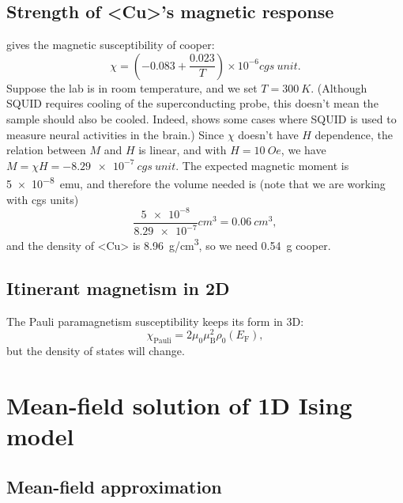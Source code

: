 \documentclass[hyperref, a4paper]{article}
\def\ce#1{<#1>}%
\newcommand*{\efermi}{E_{\text{F}}}
\newcommand*{\muB}{\mu_{\text{B}}}
\begin{document}
\subsection{Strength of \ce{Cu}'s magnetic response}

\cite{cooper_magnetic} gives the magnetic susceptibility of cooper:
\begin{equation}
    \chi=\left(-0.083+\frac{0.023}{T}\right) \times 10^{-6} \unit{cgs\ unit}.
\end{equation}
Suppose the lab is in room temperature, 
and we set $T = \SI{300}{K}$.
(Although SQUID requires cooling of the superconducting probe, 
this doesn't mean the sample should also be cooled. 
Indeed, \cite{singh2014magnetoencephalography} shows 
some cases where SQUID is used to measure 
neural activities in the brain.)
Since $\chi$ doesn't have $H$ dependence,
the relation between $M$ and $H$ is linear,
and with $H = \SI{10}{Oe}$,
we have $M = \chi H = \SI{-8.29e-7}{cgs\ unit}$.
The expected magnetic moment is \SI{5e-8}{emu}, 
and therefore the volume needed is (note that we are working with cgs units)
\[
    \frac{\num{5e-8}}{\num{8.29e-7}} \unit{cm^3} = \SI{0.06}{cm^3},
\]
and the density of \ce{Cu} is \SI{8.96}{g/cm^3},
so we need \SI{0.54}{g} cooper.

\subsection{Itinerant magnetism in 2D}

The Pauli paramagnetism susceptibility keeps its form in 3D:
\begin{equation}
    \chi_{\text{Pauli}} = 2 \mu_0 \muB^2 \rho_0(\efermi),
\end{equation}
but the density of states will change. 


\section{Mean-field solution of 1D Ising model}

\subsection{Mean-field approximation}\label{sec:ising.mf}
\end{document}
